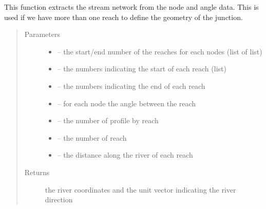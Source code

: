 \documentclass[letterpaper,10pt,english]{sphinxmanual}
\begin{document}
\begin{fulllineitems}
\label{\detokenize{index:src.mascaret.define_stream_network}}
This function extracts the stream network from the node and angle data. This is used if we have more than one
reach to define the geometry of the junction.
\begin{quote}\begin{description}
\item[{Parameters}] \leavevmode\begin{itemize}
\item {} 
 -- the start/end number of the reaches for each nodes (list of list)

\item {} 
 -- the numbers indicating the start of each reach (list)

\item {} 
 -- the numbers indicating the end of each reach

\item {} 
 -- for each node the angle between the reach

\item {} 
 -- the number of profile by reach

\item {} 
 -- the number of reach

\item {} 
 -- the distance along the river of each reach

\end{itemize}

\item[{Returns}] \leavevmode
the river coordinates and the unit vector indicating the river direction

\end{description}\end{quote}

\end{fulllineitems}

\end{document}
